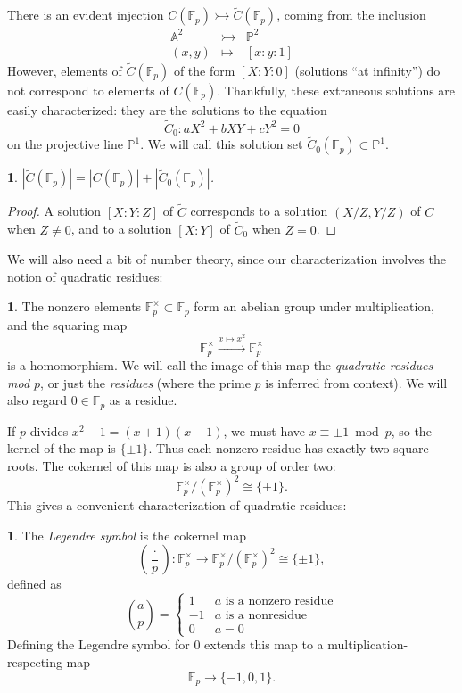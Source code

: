 \documentclass[10pt,a4paper]{amsart}
\numberwithin{equation}{section}
\numberwithin{figure}{section}
\numberwithin{table}{section}
\theoremstyle{definition}
\theoremstyle{plain}
\theoremstyle{remark}
\theoremstyle{plain}
\theoremstyle{definition}
\newtheorem{defn}[thm]{\protect\definitionname}
\theoremstyle{plain}
\theoremstyle{plain}
\newtheorem{lem}[thm]{\protect\lemmaname}
\providecommand{\definitionname}{Definition}
\providecommand{\lemmaname}{Lemma}
\newcommand{\legendre}[2]{\genfrac{(}{)}{}{}{#1}{#2}}
\newcommand{\A}{\mathbb{A}}
\renewcommand{\P}{\mathbb{P}}
\newcommand{\F}{\mathbb{F}}
\begin{document}
	There is an evident injection $C(\F_p) \rightarrowtail \widetilde{C}(\F_p)$,
	coming from the inclusion 
	\begin{eqnarray*}
	    \A^2 &\rightarrowtail& \P^2 \\
	    (x,y) &\mapsto& [x:y:1]
	\end{eqnarray*}
	However, elements of $\widetilde{C}(\F_p)$ of the form $[X:Y:0]$ 
	(solutions ``at infinity'') do not correspond to elements of $C(\F_p)$.
	Thankfully, these extraneous solutions are easily characterized: they are the
	solutions to the equation
	\begin{equation}\label{eq:projective-conic-at-infinity} 
	\widetilde{C}_0 \colon aX^2 + bXY + cY^2 = 0
	\end{equation} 
	on the projective line $\P^1$. We will call this solution set $\widetilde{C}_0(\F_p)\subset \P^1$.  
	
	\begin{lem}\label{lem:relate-solutions-affine-proj}
		$|\widetilde{C}(\F_p)| = |C(\F_p)| + |\widetilde{C}_0(\F_p)|$.
	\end{lem} 
	\begin{proof}
		A solution $[X:Y:Z]$ of $\widetilde{C}$ corresponds 
		to a solution $(X/Z,Y/Z)$ of $C$ when $Z \neq 0$,
		and to a solution $[X:Y]$ of $\widetilde{C}_0$ 
		when $Z = 0$.  
	\end{proof}
	
	We will also need a bit of number theory, since our characterization
	involves the notion of quadratic residues:
	\begin{defn}
		The nonzero elements $\F_p^\times \subset \F_p$ form an abelian
		group under multiplication, and the squaring map 
		\[ \F^\times_p \xrightarrow{x \mapsto x^2} \F^\times_p \]
		is a homomorphism. We will call the image of this map the
		\emph{quadratic residues mod $p$}, or just the \emph{residues} (where the
		prime $p$ is inferred from context). We will also regard $0\in\F_p$ as a residue.
	\end{defn}
	
	If $p$ divides $x^2 - 1 = (x+1)(x-1)$, we must have $x \equiv \pm 1 \bmod{p}$, so 
	the kernel of the map is $\{\pm 1\}$. Thus each nonzero residue has exactly two 
	square roots. The cokernel of this map is also a group of order two: 
	\begin{equation}\label{eqn:cokersquare}
\F_p^\times / (\F_p^\times)^2 \cong \{\pm 1\}.
\end{equation}
	This gives a convenient characterization of quadratic residues:
	\begin{defn}
		The \emph{Legendre symbol} is the cokernel map    
		\[ \legendre{\cdot}{p}: 
		\F_p^\times \to \F_p^\times / (\F_p^\times)^2 \cong \{\pm 1\}, \]
		defined as
		\[ \legendre{a}{p} = \begin{cases}
		    1 & a \text{ is a nonzero residue} \\
		    -1 & a \text{ is a nonresidue} \\
		    0 & a = 0
		\end{cases} \]
		Defining the Legendre symbol for $0$ extends this map to a 
		multiplication-respecting map
		\[ \F_p \to \{-1,0,1\}. \]
	\end{defn}
	
\end{document}
